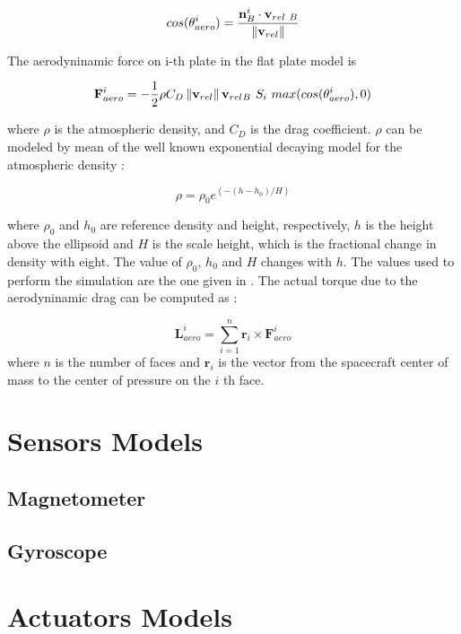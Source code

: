\documentclass[11pt,a4paper]{report}
\begin{document}
\begin{equation}
 cos(\theta_{aero}^{i}) = \frac{\mathbf{n}_{B}^{i} \cdot \mathbf{v}_{rel\ B}}{\norm{\mathbf{v}_{rel}}}
\end{equation}

The aerodyninamic force on i-th plate in the flat plate model is

\begin{equation}
 \mathbf{F}_{aero}^{i} = - \frac{1}{2} \rho C_{D} \norm{\mathbf{v}_{rel}} \mathbf{v}_{rel_{} B}\ S_{i}\ max(cos(\theta_{aero}^{i}),0)
\end{equation}

where $\rho$ is the atmospheric density, and $C_D$ is the drag coefficient.  
$\rho$ can be modeled by mean of the well known exponential decaying model for the atmospheric density :

\begin{equation}
 \rho = \rho_{0} e^{(-(h-h_{0})/H)}
\end{equation}

where $\rho_{0}$ and $h_{0}$ are reference density and height, respectively, $h$ is the height above the ellipsoid and $H$ is the scale height, which is the fractional change in density with eight.
The value of $\rho_{0}$, $h_{0}$  and $H$ changes with $h$. 
The values used to perform the simulation are the one given in \cite{Ref:Books:Fundamentals}.
The actual torque due to the aerodyninamic drag can be computed as : 

\begin{equation}
\mathbf{L}_{aero}^{i} = \sum\limits_{i=1}^n  \mathbf{r}_{i} \times \mathbf{F}_{aero}^{i}
\end{equation}
where $n$ is the number of faces and $\mathbf{r}_{i}$ is the vector from the spacecraft center of mass to the center of pressure on the $i$ th face.\\

\section{Sensors Models}
\subsection{Magnetometer}
\subsection{Gyroscope}
\section{Actuators Models}
\end{document}
